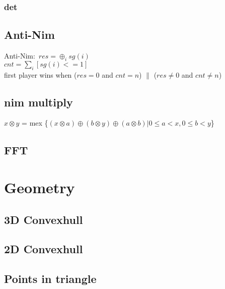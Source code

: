 \documentclass[a4paper,5pt,twocolumn,titlepage]{article}
\begin{document}
\begin{CJK*}{GBK}{song}
        \subsubsection{det}
            
       \subsection{Anti-Nim}
       Anti-Nim:\
    $res = \oplus _{i} sg(i)$ \\
    $cnt  = \sum_{i} [sg(i) <= 1]$\\
    first player wins when ($res = 0$ and $cnt = n$) $\parallel$ ($res \neq 0$ and $ cnt \neq n$)
       \subsection{nim multiply}
        $x \otimes y$ = mex \{$(x \otimes a) \oplus (b \otimes y) \oplus (a \otimes b)|0 \leq a < x, 0 \leq b < y$\}
        
    \subsection{FFT}
        
\section{Geometry}
\subsection{3D Convexhull}

\subsection{2D Convexhull}

\subsection{Points in triangle}

\end{CJK*}
\end{document}
